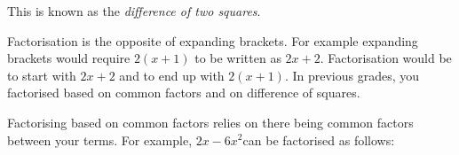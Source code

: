         \label{m39383*id268642}\nopagebreak\noindent{}
        \label{m39383*id268705}This is known as the \textsl{difference of two squares}.\par 
      \label{m39383*uid5}
            \nopagebreak
        \label{m39383*id268725}Factorisation is the opposite of expanding brackets. For example expanding brackets would require $2\left(x+1\right)$ to be written as $2x+2$. Factorisation would be to start with $2x+2$\hspace{1ex} and to end up with $2\left(x+1\right)$. In previous grades, you factorised based on common factors and on difference of squares.\par 
        \label{m39383*uid6}
            \nopagebreak
          \label{m39383*id268808}Factorising based on common factors relies on there being common factors between your terms. For example, $2x-6{x}^{2}$\hspace{1ex}can be factorised as follows:\par 
          \label{m39383*id268835}\nopagebreak\noindent{}
